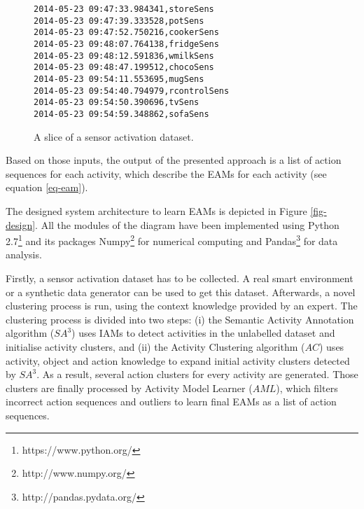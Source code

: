 \begin{figure}[htbp]
\begin{small}
\begin{lstlisting}
2014-05-23 09:47:33.984341,storeSens
2014-05-23 09:47:39.333528,potSens
2014-05-23 09:47:52.750216,cookerSens
2014-05-23 09:48:07.764138,fridgeSens
2014-05-23 09:48:12.591836,wmilkSens
2014-05-23 09:48:47.199512,chocoSens
2014-05-23 09:54:11.553695,mugSens
2014-05-23 09:54:40.794979,rcontrolSens
2014-05-23 09:54:50.390696,tvSens
2014-05-23 09:54:59.348862,sofaSens
\end{lstlisting}
\end{small}
\caption{A slice of a sensor activation dataset.}
\label{fig-dataset}
\end{figure}

Based on those inputs, the output of the presented approach is a list of action sequences for each activity, which describe the EAMs for each activity (see equation \ref{eq-eam}). %

The designed system architecture to learn EAMs is depicted in Figure \ref{fig-design}. All the modules of the diagram have been implemented using Python 2.7\footnote{https://www.python.org/} and its packages Numpy\footnote{http://www.numpy.org/} for numerical computing and Pandas\footnote{http://pandas.pydata.org/} for data analysis. 

Firstly, a sensor activation dataset has to be collected. A real smart environment or a synthetic data generator can be used to get this dataset. Afterwards, a novel clustering process is run, using the context knowledge provided by an expert. The clustering process is divided into two steps: (i) the Semantic Activity Annotation algorithm ($SA^3$) uses IAMs to detect activities in the unlabelled dataset and initialise activity clusters, and (ii) the Activity Clustering algorithm ($AC$) uses activity, object and action knowledge to expand initial activity clusters detected by $SA^3$. As a result, several action clusters for every activity are generated. Those clusters are finally processed by Activity Model Learner ($AML$), which filters incorrect action sequences and outliers to learn final EAMs as a list of action sequences.

